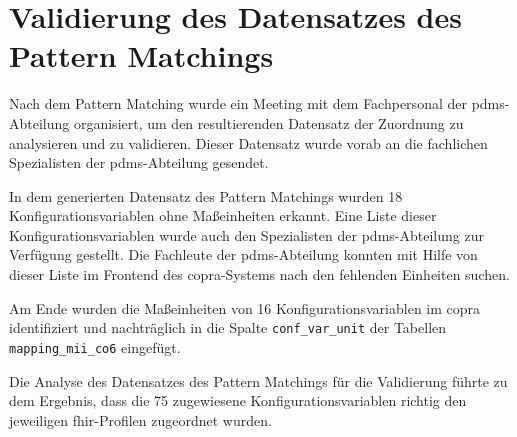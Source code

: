 \section{Validierung des Datensatzes des Pattern Matchings } \label{sec:validmethode}

Nach dem Pattern Matching wurde ein Meeting mit dem Fachpersonal der \ac{pdms}-Abteilung organisiert, um den resultierenden Datensatz der Zuordnung zu analysieren und zu validieren. Dieser Datensatz wurde vorab an die fachlichen Spezialisten der \ac{pdms}-Abteilung gesendet.

In dem generierten Datensatz des Pattern Matchings wurden 18 Konfigurationsvariablen ohne Maßeinheiten erkannt. Eine Liste dieser Konfigurationsvariablen wurde auch den Spezialisten der \ac{pdms}-Abteilung zur Verfügung gestellt. Die Fachleute der \ac{pdms}-Abteilung konnten mit Hilfe von dieser Liste im Frontend des \ac{copra}-Systems nach den fehlenden Einheiten suchen.

Am Ende wurden die Maßeinheiten von 16 Konfigurationsvariablen im \ac{copra} identifiziert und nachträglich in die Spalte \texttt{conf\_var\_unit} der Tabellen \texttt{mapping\_mii\_co6} eingefügt.

Die Analyse des Datensatzes des Pattern Matchings für die Validierung führte zu dem Ergebnis, dass die 75 zugewiesene Konfigurationsvariablen richtig den jeweiligen \ac{fhir}-Profilen zugeordnet wurden.